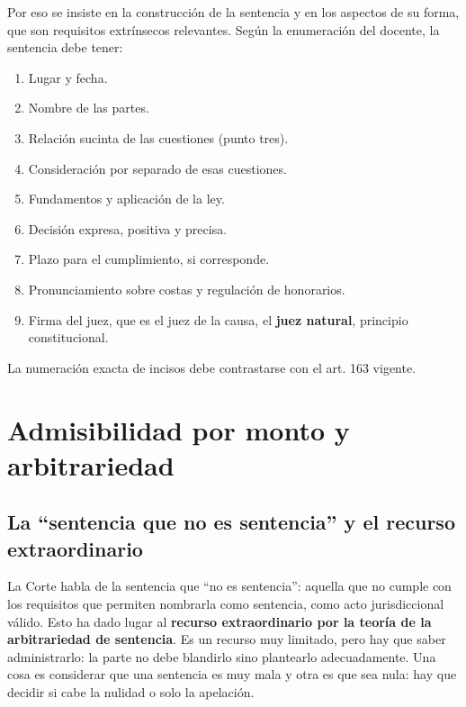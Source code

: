 \documentclass[12pt,oneside]{book}
\begin{document}
Por eso se insiste en la construcci\'on de la sentencia y en los aspectos de su forma, que son requisitos extr\'insecos relevantes. Seg\'un la enumeraci\'on del docente, la sentencia debe tener:

\begin{enumerate}
    \item Lugar y fecha.
    \item Nombre de las partes.
    \item Relaci\'on sucinta de las cuestiones (punto tres).
    \item Consideraci\'on por separado de esas cuestiones.
    \item Fundamentos y aplicaci\'on de la ley.
    \item Decisi\'on expresa, positiva y precisa.
    \item Plazo para el cumplimiento, si corresponde.
    \item Pronunciamiento sobre costas y regulaci\'on de honorarios.
    \item Firma del juez, que es el juez de la causa, el \textbf{juez natural}, principio constitucional.
\end{enumerate}

La numeraci\'on exacta de incisos debe contrastarse con el art. 163 vigente.


\section{Admisibilidad por monto y arbitrariedad}

\subsection{La ``sentencia que no es sentencia'' y el recurso extraordinario}

La Corte habla de la sentencia que ``no es sentencia'': aquella que no cumple con los requisitos que permiten nombrarla como sentencia, como acto jurisdiccional v\'alido. Esto ha dado lugar al \textbf{recurso extraordinario por la teor\'ia de la arbitrariedad de sentencia}. Es un recurso muy limitado, pero hay que saber administrarlo: la parte no debe blandirlo sino plantearlo adecuadamente. Una cosa es considerar que una sentencia es muy mala y otra es que sea nula: hay que decidir si cabe la nulidad o solo la apelaci\'on.
\end{document}
